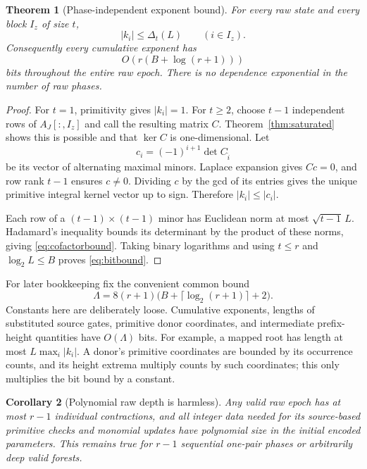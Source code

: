 \documentclass[11pt,letterpaper]{article}
\newtheorem{theorem}{Theorem}[section]
\newtheorem{corollary}[theorem]{Corollary}
\theoremstyle{definition}
\theoremstyle{remark}\newtheorem{remark}[theorem]{Remark}
\begin{document}
\begin{theorem}[Phase-independent exponent bound]
\label{thm:main}
For every raw state and every block $I_z$ of size $t$,
\begin{equation}
 |k_i|\le\Delta_t(L)\qquad(i\in I_z).
 \label{eq:cofactorbound}
\end{equation}
Consequently every cumulative exponent has
\begin{equation}
 O\!\left(r(B+\log(r+1))\right)
 \label{eq:bitbound}
\end{equation}
bits throughout the entire raw epoch. There is no dependence exponential
in the number of raw phases.
\end{theorem}
\begin{proof}
For $t=1$, primitivity gives $|k_i|=1$. For $t\ge2$, choose $t-1$
independent rows of $A_J[:,I_z]$ and call the resulting matrix $C$.
Theorem~\ref{thm:saturated} shows this is possible and that $\ker C$ is
one-dimensional. Let
\[
 c_i=(-1)^{i+1}\det C_{\widehat{i}}
\]
be its vector of alternating maximal minors. Laplace expansion gives
$Cc=0$, and row rank $t-1$ ensures $c\ne0$. Dividing $c$ by the gcd of its
entries gives the unique primitive integral kernel vector up to sign.
Therefore $|k_i|\le |c_i|$.

Each row of a $(t-1)\times(t-1)$ minor has Euclidean norm at most
$\sqrt{t-1}\,L$. Hadamard's inequality bounds its determinant by the product
of these norms, giving \eqref{eq:cofactorbound}. Taking binary logarithms
and using $t\le r$ and $\log_2 L\le B$ proves \eqref{eq:bitbound}.
\end{proof}

For later bookkeeping fix the convenient common bound
\begin{equation}
 \Lambda=8(r+1)\bigl(B+\lceil\log_2(r+1)\rceil+2\bigr).
 \label{eq:Lambda}
\end{equation}
Constants here are deliberately loose. Cumulative exponents, lengths of
substituted source gates, primitive donor coordinates, and intermediate
prefix-height quantities have $O(\Lambda)$ bits. For example, a mapped
root has length at most $L\max_i|k_i|$. A donor's primitive coordinates
are bounded by its occurrence counts, and its height extrema multiply
counts by such coordinates; this only multiplies the bit bound by a constant.

\begin{corollary}[Polynomial raw depth is harmless]
\label{cor:depth}
Any valid raw epoch has at most $r-1$ individual contractions, and all
integer data needed for its source-based primitive checks and monomial
updates have polynomial size in the initial encoded parameters. This remains
true for $r-1$ sequential one-pair phases or arbitrarily deep valid forests.
\end{corollary}
\end{document}
